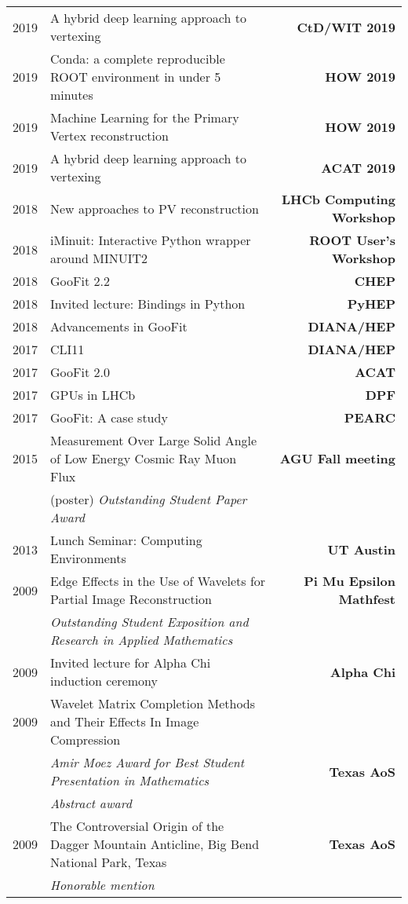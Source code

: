 \documentclass[10pt,letterpaper]{moderncv}
\begin{document}
\begin{tabularx}{\textwidth}{p{.33in}X>{\bfseries}r}
    2019 & A hybrid deep learning approach to vertexing & CtD/WIT 2019 \\
    2019 & Conda: a complete reproducible ROOT environment in under 5 minutes & HOW 2019 \\
    2019 & Machine Learning for the Primary Vertex reconstruction & HOW 2019 \\
    2019 & A hybrid deep learning approach to vertexing & ACAT 2019 \\ %
	2018 & New approaches to PV reconstruction & LHCb Computing Workshop \\ %
	2018 & iMinuit: Interactive Python wrapper around MINUIT2 & ROOT User's Workshop \\  %
	2018 & GooFit 2.2 & CHEP \\ %
	2018 & Invited lecture: Bindings in Python & PyHEP  \\
    2018 & Advancements in GooFit & DIANA/HEP \\
	2017 & CLI11 & DIANA/HEP \\
	2017 & GooFit 2.0 & ACAT \\
	2017 & GPUs in LHCb & DPF \\ %
	2017 & GooFit: A case study & PEARC \\


	2015 & Measurement Over Large Solid Angle of Low Energy Cosmic Ray Muon Flux &  AGU Fall meeting \\
	 & (poster) \emph{Outstanding Student Paper Award} & \\
	 2013 & Lunch Seminar: Computing Environments & UT Austin \\
	 2009 & Edge Effects in the Use of Wavelets for Partial Image Reconstruction & Pi Mu Epsilon Mathfest \\
	 & \emph{Outstanding Student Exposition and Research in Applied Mathematics} & \\

	 2009 & Invited lecture for Alpha Chi induction ceremony & Alpha Chi  \\

	 2009 & Wavelet Matrix Completion Methods and Their Effects In Image Compression &  \\
	  & \emph{Amir Moez Award for Best Student Presentation in Mathematics} & Texas AoS \\
	  & \emph{Abstract award} & \\

	  2009 & The Controversial Origin of the Dagger Mountain Anticline, Big Bend National Park, Texas &  Texas AoS \\
	  & \emph{Honorable mention} & \\


\end{tabularx}
\end{document}
